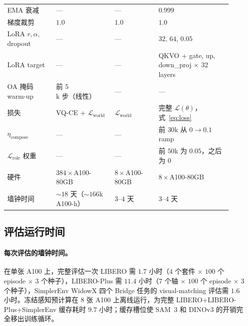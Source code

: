 \begin{center}
\begin{tabular}{p{0.20\linewidth}p{0.24\linewidth}p{0.18\linewidth}p{0.30\linewidth}}
EMA 衰减                & ---                                       & ---                     & $0.999$ \\
梯度裁剪        & $1.0$                                     & $1.0$                   & $1.0$ \\
LoRA $r,\alpha,$ dropout & ---                                       & ---                     & $32$, $64$, $0.05$ \\
LoRA target              & ---                                       & ---                     & QKVO + gate, up, down\_proj $\times$ 32 layers \\
OA 掩码 warm-up          & 前 $5$k 步（线性）                 & ---                     & --- \\
损失                     & VQ-CE + $\mathcal{L}_\mathrm{world}$      & $\mathcal{L}_\mathrm{world}$ & 完整 $\mathcal{L}(\theta)$，式~\eqref{eq:loss} \\
$\eta_\mathrm{compose}$  & ---                                       & ---                     & 前 $30$k 从 $0\!\to\!0.1$ ramp \\
$\mathcal{L}_\mathrm{role}$ 权重 & ---                             & ---                     & 前 $50$k 为 $0.05$，之后为 $0$ \\
硬件                 & $384\!\times\!$A100-80GB                  & $8\!\times\!$A100-80GB  & $8\!\times\!$A100-80GB \\
墙钟时间               & $\sim\!18$ 天（$\sim\!166$k A100-h）     & $3$--$4$ 天           & $3$--$4$ 天 \\
\bottomrule
\end{tabular}
\end{center}

\subsection*{评估运行时间}

\paragraph{每次评估的墙钟时间。}
在单张 A100 上，完整评估一次 LIBERO 需 $1.7$ 小时（$4$ 个套件 $\times$ $100$ 个 episode $\times$ $3$ 个种子），LIBERO-Plus 需 $11.4$ 小时（$7$ 个轴 $\times$ $100$ 个 episode $\times$ $3$ 个种子），SimplerEnv WidowX 四个 Bridge 任务的 visual-matching 评估需 $1.6$ 小时。冻结感知预计算在 $8$ 张 A100 上离线运行，为完整 LIBERO+LIBERO-Plus+SimplerEnv 缓存耗时 $9.7$ 小时；缓存槽位使 SAM~3 和 DINOv3 的开销完全移出训练循环。

